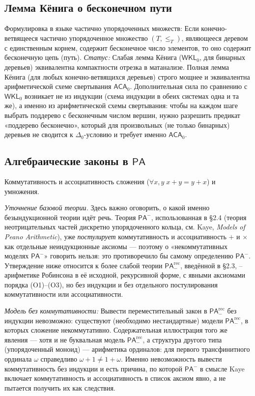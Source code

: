 \documentclass[12pt,a4paper]{article}
\theoremstyle{plain}
\theoremstyle{definition}
\newcommand{\PA}{\textsf{PA}}
\newcommand{\PArec}{\PA^{\mathrm{rec}}_{-}}
\begin{document}
\subsection{Лемма Кёнига о бесконечном пути}
Формулировка в языке частично упорядоченных множеств: Если конечно-ветвящееся частично упорядоченное множество $(T, \leqslant_T)$, являющееся деревом с единственным корнем, содержит бесконечное число элементов, то оно содержит бесконечную цепь (путь).
\textit{Статус:} Слабая лемма Кёнига ($\textsf{WKL}_0$, для бинарных деревьев) эквивалентна компактности отрезка в матанализе. Полная лемма Кёнига (для любых конечно-ветвящихся деревьев) строго мощнее и эквивалентна арифметической схеме свертывания $\textsf{ACA}_0$. Дополнительная сила по сравнению с $\textsf{WKL}_0$ возникает не из индукции (схема индукции в обеих системах одна и та же), а именно из арифметической схемы свертывания: чтобы на каждом шаге выбрать поддерево с бесконечным числом вершин, нужно разрешить предикат «поддерево бесконечно», который для произвольных (не только бинарных) деревьев не сводится к $\Delta_0$-условию и требует именно $\textsf{ACA}_0$.

\subsection{Алгебраические законы в $\PA$}
Коммутативность и ассоциативность сложения ($\forall x, y \; x+y = y+x$) и умножения.

\textit{Уточнение базовой теории.} Здесь важно оговорить, о какой именно безындукционной теории идёт речь. Теория $\PA^-$, использованная в §2.4 (теория неотрицательных частей дискретно упорядоченного кольца, см. Kaye, \textit{Models of Peano Arithmetic}), уже \emph{постулирует} коммутативность и ассоциативность $+$ и $\times$ как отдельные неиндукционные аксиомы --- поэтому о «некоммутативных моделях $\PA^-$» говорить нельзя: это противоречило бы самому определению $\PA^-$. Утверждение ниже относится к более слабой теории $\PArec$, введённой в §2.3, -- арифметике Робинсона в её исходной, рекурсивной форме, с явными аксиомами порядка (O1)--(O3), но без индукции и без отдельного постулирования коммутативности или ассоциативности.

\textit{Модель без коммутативности:} Вывести переместительный закон в $\PArec$ без индукции невозможно: существуют (необходимо нестандартные) модели $\PArec$, в которых сложение некоммутативно. Содержательная иллюстрация того же явления --- хотя и не буквальная модель $\PArec$, а структура другого типа (упорядоченный моноид) --- арифметика ординалов: для первого трансфинитного ординала $\omega$ справедливо $\omega + 1 \neq 1 + \omega$. Именно невозможность вывести коммутативность без индукции и есть причина, по которой $\PA^-$ в смысле Kaye включает коммутативность и ассоциативность в список аксиом явно, а не пытается получить их как следствия.
\end{document}
